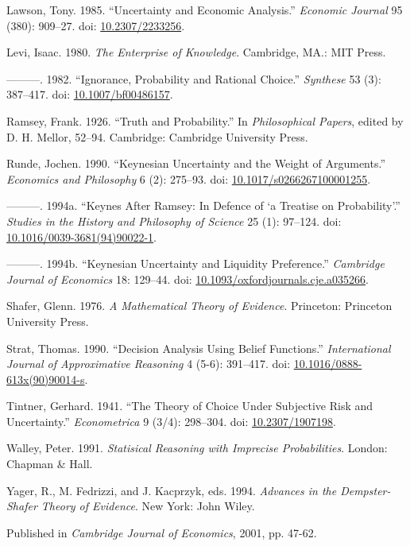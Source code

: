 \documentclass[
  10pt,
  letterpaper,
  DIV=11,
  numbers=noendperiod,
  twoside]{scrartcl}
\newlength{\cslhangindent}
\newenvironment{CSLReferences}[2] %
 {\begin{list}{}{%
  \setlength{\itemindent}{0pt}
  \setlength{\leftmargin}{0pt}
  \setlength{\parsep}{0pt}
  \ifodd #1
   \setlength{\leftmargin}{\cslhangindent}
   \setlength{\itemindent}{-1\cslhangindent}
  \fi
  \setlength{\itemsep}{#2\baselineskip}}}
 {\end{list}}
\begin{document}
\begin{CSLReferences}{1}{0}
Lawson, Tony. 1985. {``Uncertainty and Economic Analysis.''}
\emph{Economic Journal} 95 (380): 909--27. doi:
\href{https://doi.org/10.2307/2233256}{10.2307/2233256}.

Levi, Isaac. 1980. \emph{The Enterprise of Knowledge}. Cambridge, MA.:
MIT Press.

---------. 1982. {``Ignorance, Probability and Rational Choice.''}
\emph{Synthese} 53 (3): 387--417. doi:
\href{https://doi.org/10.1007/bf00486157}{10.1007/bf00486157}.

Ramsey, Frank. 1926. {``Truth and Probability.''} In \emph{Philosophical
Papers}, edited by D. H. Mellor, 52--94. Cambridge: Cambridge University
Press.

Runde, Jochen. 1990. {``Keynesian Uncertainty and the Weight of
Arguments.''} \emph{Economics and Philosophy} 6 (2): 275--93. doi:
\href{https://doi.org/10.1017/s0266267100001255}{10.1017/s0266267100001255}.

---------. 1994a. {``Keynes After Ramsey: In Defence of {`a Treatise on
Probability'}.''} \emph{Studies in the History and Philosophy of
Science} 25 (1): 97--124. doi:
\href{https://doi.org/10.1016/0039-3681(94)90022-1}{10.1016/0039-3681(94)90022-1}.

---------. 1994b. {``Keynesian Uncertainty and Liquidity Preference.''}
\emph{Cambridge Journal of Economics} 18: 129--44. doi:
\href{https://doi.org/10.1093/oxfordjournals.cje.a035266}{10.1093/oxfordjournals.cje.a035266}.

Shafer, Glenn. 1976. \emph{A Mathematical Theory of Evidence}.
Princeton: Princeton University Press.

Strat, Thomas. 1990. {``Decision Analysis Using Belief Functions.''}
\emph{International Journal of Approximative Reasoning} 4 (5-6):
391--417. doi:
\href{https://doi.org/10.1016/0888-613x(90)90014-s}{10.1016/0888-613x(90)90014-s}.

Tintner, Gerhard. 1941. {``The Theory of Choice Under Subjective Risk
and Uncertainty.''} \emph{Econometrica} 9 (3/4): 298--304. doi:
\href{https://doi.org/10.2307/1907198}{10.2307/1907198}.

Walley, Peter. 1991. \emph{Statisical Reasoning with Imprecise
Probabilities}. London: Chapman \& Hall.

Yager, R., M. Fedrizzi, and J. Kacprzyk, eds. 1994. \emph{Advances in
the Dempster- Shafer Theory of Evidence}. New York: John Wiley.

\end{CSLReferences}



\noindent Published in\emph{
Cambridge Journal of Economics}, 2001, pp. 47-62.
\end{document}
